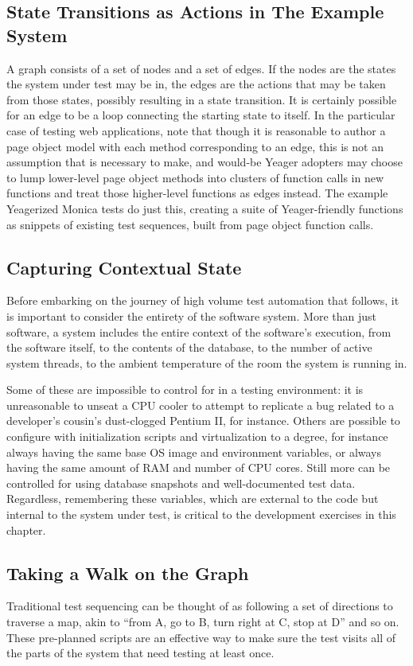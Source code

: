 \subsection{State Transitions as Actions in The Example System}
A graph consists of a set of nodes and a set of edges. If the nodes are the states the system under test may be in, the edges are the actions that may be taken from those states, possibly resulting in a state transition. It is certainly possible for an edge to be a loop connecting the starting state to itself. In the particular case of testing web applications, note that though it is reasonable to author a page object model with each method corresponding to an edge, this is not an assumption that is necessary to make, and would-be Yeager adopters may choose to lump lower-level page object methods into clusters of function calls in new functions and treat those higher-level functions as edges instead. The example Yeagerized Monica tests do just this, creating a suite of Yeager-friendly functions as snippets of existing test sequences, built from page object function calls.

\subsection{Capturing Contextual State}
Before embarking on the journey of high volume test automation that follows, it is important to consider the entirety of the software system. More than just software, a system includes the entire context of the software's execution, from the software itself, to the contents of the database, to the number of active system threads, to the ambient temperature of the room the system is running in.

Some of these are impossible to control for in a testing environment: it is unreasonable to unseat a CPU cooler to attempt to replicate a bug related to a developer's cousin's dust-clogged Pentium II, for instance. Others are possible to configure with initialization scripts and virtualization to a degree, for instance always having the same base OS image and environment variables, or always having the same amount of RAM and number of CPU cores. Still more can be controlled for using database snapshots and well-documented test data. Regardless, remembering these variables, which are external to the code but internal to the system under test, is critical to the development exercises in this chapter. \citep{HoffmanTradeoffs}

\subsection{Taking a Walk on the Graph}
Traditional test sequencing can be thought of as following a set of directions to traverse a map, akin to ``from A, go to B, turn right at C, stop at D'' and so on. These pre-planned scripts are an effective way to make sure the test visits all of the parts of the system that need testing at least once.


